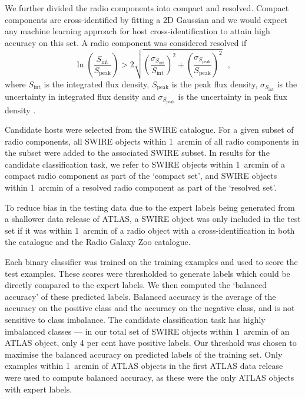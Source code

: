 \documentclass[fleqn,usenatbib,usedcolumn]{mnras}
\newcommand{\edited}[1]{#1}
\begin{document}
    We further divided the radio components into compact and resolved. Compact
    components are cross-identified by fitting a 2D Gaussian \citep[as
    in][]{norris06} and we would expect any machine learning approach for host
    cross-identification to attain high accuracy on this set. A radio component was
    considered resolved if
    \begin{equation}
      \label{eq:compact}
        \ln \left(
          \frac{S_{\text{int}}}
               {S_{\text{peak}}}
        \right) > 2\sqrt{\left(
          \frac{\sigma_{S_{\text{int}}}}
               {S_{\text{int}}}
        \right)^2 + \left(
          \frac{\sigma_{S_{\text{peak}}}}
               {S_{\text{peak}}}
        \right)^2}\,\,\,\,,
    \end{equation}%
    where \(S_{\text{int}}\) is the integrated flux density,
    \(S_{\text{peak}}\) is the peak flux density, \edited{$\sigma_{S_{\text{int}}}$ is
    the uncertainty in integrated flux density and $\sigma_{S_{\text{peak}}}$
    is the uncertainty in peak flux density} \citep[following][]{franzen15}.

    Candidate hosts were selected from the SWIRE catalogue. For a given subset
    of radio components, all SWIRE objects within 1~arcmin of all radio
    components in the subset were added to the associated SWIRE subset. In results
    for the candidate classification task, we refer to SWIRE objects
    within 1~arcmin of a compact radio component as part of the `compact set',
    and SWIRE objects within 1~arcmin of a resolved radio component as part of
    the `resolved set'.

    To reduce bias in the testing data due to the expert labels being
    generated from a shallower data release of ATLAS, a SWIRE object was only
    included in the test set if it was within 1~arcmin of a radio object with
    a cross-identification in both the \citet{norris06} catalogue and the
    Radio Galaxy Zoo catalogue.

    Each binary classifier was trained on the training examples and used to
    \edited{score the test examples. These scores were thresholded to generate labels which could be directly compared
    to the expert labels. We then computed the `balanced accuracy' of these predicted labels.} Balanced
    accuracy is the average of the accuracy on the positive class and the
    accuracy on the negative class, and is not sensitive to class imbalance.
    The candidate classification task has highly imbalanced classes --- in our
    total set of SWIRE objects within 1~arcmin of an ATLAS object, only 4 per
    cent have positive labels. \edited{Our threshold was chosen to maximise the balanced
    accuracy on predicted labels of the training set.} Only examples within 1~arcmin of ATLAS objects
    in the first ATLAS data release \citep{norris06} were used to compute
    balanced accuracy, as these were the only ATLAS objects with expert labels.
\end{document}
